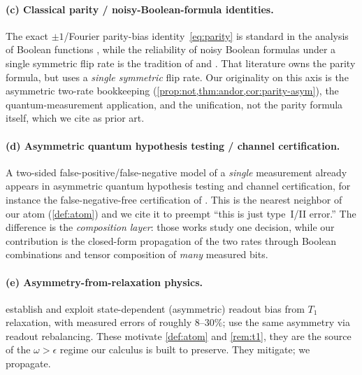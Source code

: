 \documentclass[a4paper,onecolumn,unpublished,nopdfoutputerror,allowtoday]{quantumarticle}
\numberwithin{equation}{section}
\theoremstyle{plain}
\theoremstyle{definition}
\theoremstyle{remark}
\newcommand{\eps}{\epsilon}
\begin{document}
\paragraph{(c) Classical parity / noisy-Boolean-formula identities.}
The exact $\pm1$/Fourier parity-bias identity~\eqref{eq:parity} is standard in the
analysis of Boolean functions \citep{odonnell2014}, while the reliability of noisy
Boolean formulas under a single symmetric flip rate is the tradition of
\citet{vonneumann1956} and \citet{pippenger1988}. That literature owns the parity formula, but
uses a \emph{single symmetric} flip rate. Our originality on this axis is the
asymmetric two-rate bookkeeping (\cref{prop:not,thm:andor,cor:parity-asym}), the
quantum-measurement application, and the unification, not the parity formula
itself, which we cite as prior art.

\paragraph{(d) Asymmetric quantum hypothesis testing / channel certification.}
A two-sided false-positive/false-negative model of a \emph{single} measurement
already appears in asymmetric quantum hypothesis testing and channel
certification, for instance the false-negative-free certification of
\citet{krawiec2021certification}. This is the nearest neighbor of our atom
(\cref{def:atom}) and we cite it to preempt ``this is just type~I/II error.'' The
difference is the \emph{composition layer}: those works study one decision, while
our contribution is the closed-form propagation of the two rates through Boolean
combinations and tensor composition of \emph{many} measured bits.

\paragraph{(e) Asymmetry-from-relaxation physics.}
\citet{tannu2019mitigating} establish and exploit state-dependent (asymmetric)
readout bias from $T_1$ relaxation, with measured errors of roughly $8$--$30\%$;
\citet{hicks2021readout} use the same asymmetry via readout rebalancing. These
motivate \cref{def:atom} and \cref{rem:t1}, they are the source of the $\omega>\eps$
regime our calculus is built to preserve. They mitigate; we propagate.
\end{document}
